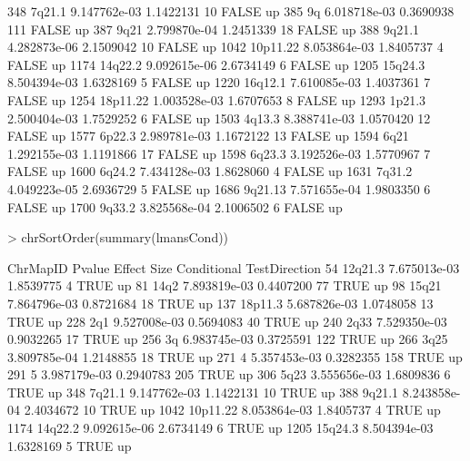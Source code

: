 \documentclass[11pt]{article}
\begin{document}
\begin{Schunk}
\begin{Soutput}
348    7q21.1 9.147762e-03 1.1422131   10       FALSE            up
385        9q 6.018718e-03 0.3690938  111       FALSE            up
387      9q21 2.799870e-04 1.2451339   18       FALSE            up
388    9q21.1 4.282873e-06 2.1509042   10       FALSE            up
1042 10p11.22 8.053864e-03 1.8405737    4       FALSE            up
1174  14q22.2 9.092615e-06 2.6734149    6       FALSE            up
1205  15q24.3 8.504394e-03 1.6328169    5       FALSE            up
1220  16q12.1 7.610085e-03 1.4037361    7       FALSE            up
1254 18p11.22 1.003528e-03 1.6707653    8       FALSE            up
1293   1p21.3 2.500404e-03 1.7529252    6       FALSE            up
1503   4q13.3 8.388741e-03 1.0570420   12       FALSE            up
1577   6p22.3 2.989781e-03 1.1672122   13       FALSE            up
1594     6q21 1.292155e-03 1.1191866   17       FALSE            up
1598   6q23.3 3.192526e-03 1.5770967    7       FALSE            up
1600   6q24.2 7.434128e-03 1.8628060    4       FALSE            up
1631   7q31.2 4.049223e-05 2.6936729    5       FALSE            up
1686  9q21.13 7.571655e-04 1.9803350    6       FALSE            up
1700   9q33.2 3.825568e-04 2.1006502    6       FALSE            up
\end{Soutput}
\begin{Sinput}
> chrSortOrder(summary(lmansCond))
\end{Sinput}
\begin{Soutput}
     ChrMapID       Pvalue    Effect Size Conditional TestDirection
54    12q21.3 7.675013e-03 1.8539775    4        TRUE            up
81       14q2 7.893819e-03 0.4407200   77        TRUE            up
98      15q21 7.864796e-03 0.8721684   18        TRUE            up
137   18p11.3 5.687826e-03 1.0748058   13        TRUE            up
228       2q1 9.527008e-03 0.5694083   40        TRUE            up
240      2q33 7.529350e-03 0.9032265   17        TRUE            up
256        3q 6.983745e-03 0.3725591  122        TRUE            up
266      3q25 3.809785e-04 1.2148855   18        TRUE            up
271         4 5.357453e-03 0.3282355  158        TRUE            up
291         5 3.987179e-03 0.2940783  205        TRUE            up
306      5q23 3.555656e-03 1.6809836    6        TRUE            up
348    7q21.1 9.147762e-03 1.1422131   10        TRUE            up
388    9q21.1 8.243858e-04 2.4034672   10        TRUE            up
1042 10p11.22 8.053864e-03 1.8405737    4        TRUE            up
1174  14q22.2 9.092615e-06 2.6734149    6        TRUE            up
1205  15q24.3 8.504394e-03 1.6328169    5        TRUE            up

\end{Soutput}
\end{Schunk}
\end{document}
